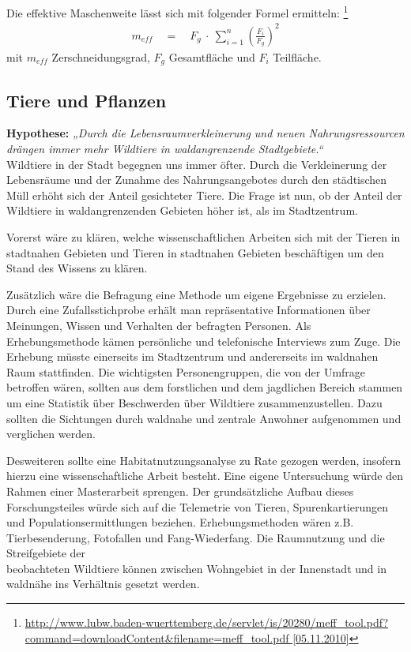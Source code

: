 \documentclass[12pt]{article}
\newcommand{\citefooturl}[1]{\footnote{\url{#1}}}
\begin{document}
Die effektive Maschenweite lässt sich mit folgender Formel ermitteln:
\citefooturl{http://www.lubw.baden-wuerttemberg.de/servlet/is/20280/meff_tool.pdf?command=downloadContent&filename=meff_tool.pdf [05.11.2010]}
\begin{align*}
 m_{eff} \quad = \quad F_g ~ \cdot ~ \sum\limits_{i=1}^{n}\left(\frac{F_i}{F_g}\right)^2
\end{align*}
mit $m_{eff}$ Zerschneidungsgrad, $F_g$ Gesamtfläche und $F_i$ Teilfläche.

\subsection{Tiere und Pflanzen}

\textbf{Hypothese:} \textit{„Durch die Lebensraumverkleinerung und neuen Nahrungsressourcen \\ drängen immer mehr Wildtiere in waldangrenzende 
            Stadtgebiete.“} \\ 

Wildtiere in der Stadt begegnen uns immer öfter. Durch die Verkleinerung der Lebensräume und der Zunahme 
des Nahrungsangebotes durch den städtischen Müll erhöht sich der Anteil gesichteter Tiere. Die Frage ist 
nun, ob der Anteil der Wildtiere in waldangrenzenden Gebieten höher ist, als im Stadtzentrum.

Vorerst wäre zu klären, welche wissenschaftlichen Arbeiten sich mit der Tieren in stadtnahen Gebieten und 
Tieren in stadtnahen Gebieten beschäftigen um den Stand des Wissens zu klären. 

Zusätzlich wäre die Befragung eine Methode um eigene Ergebnisse zu erzielen. Durch eine Zufallsstichprobe 
erhält man repräsentative  Informationen über \\ Meinungen, Wissen und Verhalten der befragten Personen. Als 
Erhebungsmethode kämen persönliche und telefonische Interviews zum Zuge. Die Erhebung müsste einerseits im 
Stadtzentrum und  andererseits im waldnahen Raum stattfinden. Die wichtigsten Personengruppen, die von der 
Umfrage betroffen wären, sollten aus dem forstlichen und dem jagdlichen Bereich stammen um eine Statistik 
über Beschwerden über Wildtiere zusammenzustellen. Dazu sollten die Sichtungen durch waldnahe und zentrale 
Anwohner aufgenommen und verglichen werden.

Desweiteren sollte eine Habitatnutzungsanalyse  zu Rate gezogen werden, insofern hierzu eine 
wissenschaftliche Arbeit besteht. Eine eigene Untersuchung würde den Rahmen einer Masterarbeit sprengen. 
Der grundsätzliche Aufbau dieses Forschungsteiles würde sich auf die Telemetrie von Tieren, Spurenkartierungen 
und Populationsermittlungen beziehen. Erhebungsmethoden wären z.B. Tierbesenderung, Fotofallen und Fang-Wiederfang. 
Die Raumnutzung und die Streifgebiete der \\ beobachteten Wildtiere können zwischen Wohngebiet in der Innenstadt und 
in waldnähe ins Verhältnis gesetzt werden. \\
\end{document}

